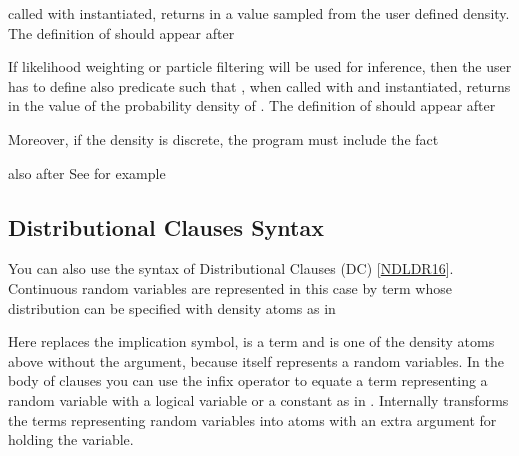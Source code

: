 \documentclass[letterpaper,10pt,english]{sphinxmanual}
\begin{document}
\sphinxAtStartPar
called with  instantiated, returns in  a value sampled from the user defined density.
The definition of  should appear after 

\sphinxAtStartPar
If likelihood weighting or particle filtering will be used for inference, then the user has to define also predicate  such that , when called with  and  instantiated, returns in  the value of the probability density of . The definition of  should appear after 

\sphinxAtStartPar
Moreover, if the density is discrete, the program must include the fact

\begin{sphinxVerbatim}[commandchars=\\\{\}]
\end{sphinxVerbatim}

\sphinxAtStartPar
also after 
See for example 


\subsection{Distributional Clauses Syntax}
\label{\detokenize{index:distributional-clauses-syntax}}
\sphinxAtStartPar
You can also use the syntax of Distributional Clauses (DC) {[}\hyperlink{cite.index:id53}{NDLDR16}{]}.
Continuous random variables are represented in this case by term whose distribution can be specified with density atoms as in

\begin{sphinxVerbatim}[commandchars=\\\{\}]
  
\end{sphinxVerbatim}

\sphinxAtStartPar
Here \sphinxcode{\sphinxupquote{:=}} replaces the implication symbol,  is a term and  is one of the density atoms above without the  argument, because  itself represents a random variables.
In the body of clauses you can use the infix operator \sphinxcode{\sphinxupquote{\textasciitilde{}=}} to equate a term representing a random variable with a logical variable or a constant as in .
Internally  transforms the terms representing random variables into atoms with an extra argument for holding the variable.
\end{document}
